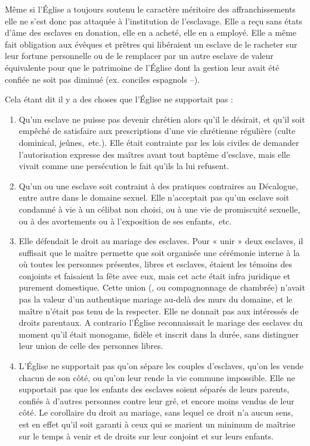  Même si l'Église a toujours soutenu le caractère méritoire des affranchissements elle ne s'est donc pas attaquée à l'institution de l'esclavage. Elle a reçu sans états d'âme des esclaves en donation, elle en a acheté, elle en a employé. Elle a même fait obligation aux évêques et prêtres qui libéraient un esclave de le racheter sur leur fortune personnelle ou de le remplacer par un autre esclave de valeur équivalente pour que le patrimoine de l’Église dont la gestion leur avait été confiée ne soit pas diminué (ex. conciles espagnols --). 

 Cela étant dit il y a des choses que l'Église ne supportait pas :
\begin{enumerate}
\item Qu'un esclave ne puisse pas devenir chrétien alors qu'il le désirait, et qu'il soit empêché de satisfaire aux prescriptions d'une vie chrétienne régulière (culte dominical, jeûnes,~etc.). Elle était contrainte par les lois civiles de demander l'autorisation expresse des maîtres avant tout baptême d'esclave, mais elle vivait comme une persécution le fait qu'ils la lui refusent.
\item Qu'un ou une esclave soit contraint à des pratiques contraires au Décalogue, entre autre dans le domaine sexuel. Elle n'acceptait pas qu'un esclave soit condamné à vie à un célibat non choisi, ou à une vie de promiscuité sexuelle, ou à des avortements ou à l'exposition de ses enfants,~etc.
\item Elle défendait le droit au mariage des esclaves. Pour « unir » deux esclaves, il suffisait que le maître permette que soit organisée une cérémonie interne à la  où toutes les personnes présentes, libres et esclaves, étaient les témoins des conjoints et faisaient la fête avec eux, mais cet acte était infra juridique et purement domestique. Cette union (, ou compagnonnage de chambrée) n'avait pas la valeur d'un authentique mariage au-delà des murs du domaine, et le maître n'était pas tenu de la respecter. Elle ne donnait pas aux intéressés de droits parentaux. A contrario l'Église reconnaissait le mariage des esclaves du moment qu'il était monogame, fidèle et inscrit dans la durée, sans distinguer leur union de celle des personnes libres.
\item L'Église ne supportait pas qu'on sépare les couples d'esclaves, qu'on les vende chacun de son côté, ou qu'on leur rende la vie commune impossible. Elle ne supportait pas que les enfants des esclaves soient séparés de leurs parents, confiés à d'autres personnes contre leur gré, et encore moins vendus de leur côté. Le corollaire du droit au mariage, sans lequel ce droit n'a aucun sens, est en effet qu'il soit garanti à ceux qui se marient un minimum de maîtrise sur le temps à venir et de droits sur leur conjoint et sur leurs enfants. 
\end{enumerate}

